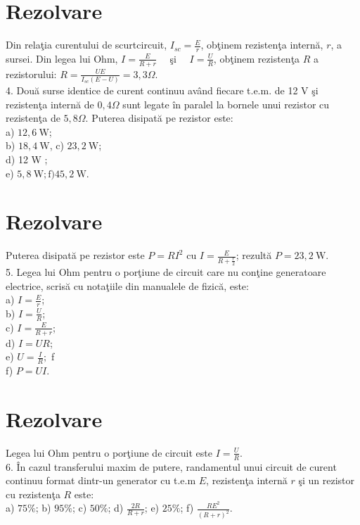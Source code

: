 \section*{Rezolvare}
Din relaţia curentului de scurtcircuit, $I_{s c}=\frac{E}{r}$, obţinem rezistenţa internă, $r$, a sursei. Din legea lui Ohm, $I=\frac{E}{R+r} \quad$ şi $\quad I=\frac{U}{R}$, obţinem rezistenţa $R$ a rezistorului: $R=\frac{U E}{I_{s c}(E-U)}=3,3 \Omega$.\\
4. Două surse identice de curent continuu având fiecare t.e.m. de 12 V şi rezistenţa internă de $0,4 \Omega$ sunt legate în paralel la bornele unui rezistor cu rezistenţa de $5,8 \Omega$. Puterea disipată pe rezistor este:\\
a) $12,6 \mathrm{~W}$;\\
b) $18,4 \mathrm{~W}$, c) $23,2 \mathrm{~W}$;\\
d) 12 W ;\\
e) $5,8 \mathrm{~W} ; \mathrm{f}) 45,2 \mathrm{~W}$.

\section*{Rezolvare}
Puterea disipată pe rezistor este $P=R I^{2}$ cu $I=\frac{E}{R+\frac{r}{2}}$; rezultă $P=23,2 \mathrm{~W}$.\\
5. Legea lui Ohm pentru o porţiune de circuit care nu conţine generatoare electrice, scrisă cu notaţiile din manualele de fizică, este:\\
a) $I=\frac{E}{r}$;\\
b) $I=\frac{U}{R}$;\\
c) $I=\frac{E}{R+r}$;\\
d) $I=U R$;\\
e) $U=\frac{I}{R} ;$ f\\
f) $P=U I$.

\section*{Rezolvare}
Legea lui Ohm pentru o porţiune de circuit este $I=\frac{U}{R}$.\\
6. În cazul transferului maxim de putere, randamentul unui circuit de curent continuu format dintr-un generator cu t.e.m $E$, rezistenţa internă $r$ şi un rezistor cu rezistenţa $R$ este:\\
a) $75 \%$; b) $95 \%$; c) $50 \%$; d) $\frac{2 R}{R+r}$; e) $25 \%$; f) $\frac{R E^{2}}{(R+r)^{2}}$.


